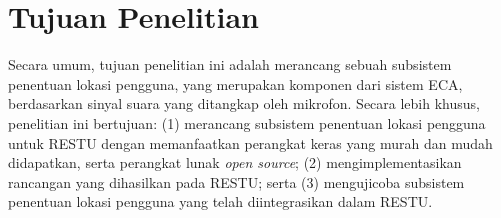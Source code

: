 \section{Tujuan Penelitian}

Secara umum, tujuan penelitian ini adalah merancang sebuah subsistem penentuan lokasi pengguna, yang merupakan komponen dari sistem ECA, berdasarkan sinyal suara yang ditangkap oleh mikrofon. Secara lebih khusus, penelitian ini bertujuan: (1) merancang subsistem penentuan lokasi pengguna untuk RESTU dengan memanfaatkan perangkat keras yang murah dan mudah didapatkan, serta perangkat lunak \textit{open source}; (2) mengimplementasikan rancangan yang dihasilkan pada RESTU; serta (3) mengujicoba subsistem penentuan lokasi pengguna yang telah diintegrasikan dalam RESTU.
